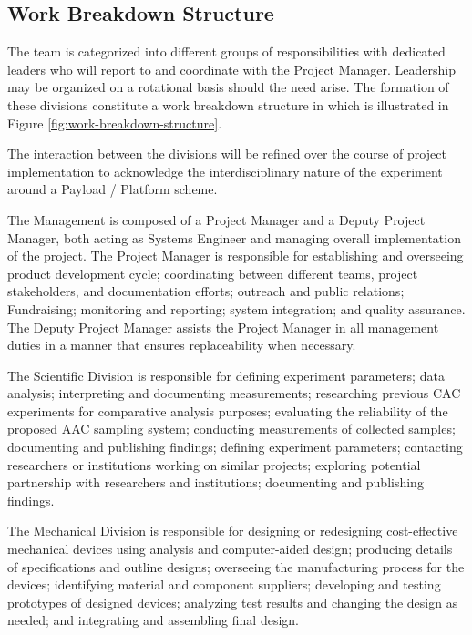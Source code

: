 
\subsection{Work Breakdown Structure}

The team is categorized into different groups of responsibilities with dedicated leaders who will report to and coordinate with the Project Manager. Leadership may be organized on a rotational basis should the need arise. The formation of these divisions constitute a work breakdown structure in which is illustrated in Figure \ref{fig:work-breakdown-structure}.


The interaction between the divisions will be refined over the course of project implementation to acknowledge the interdisciplinary nature of the experiment around a Payload / Platform scheme.

The Management is composed of a Project Manager and a Deputy Project Manager, both acting as Systems Engineer and managing overall implementation of the project. The Project Manager is responsible for establishing and overseeing product development cycle; coordinating between different teams, project stakeholders, and documentation efforts; outreach and public relations; Fundraising; monitoring and reporting; system integration; and quality assurance. The Deputy Project Manager assists the Project Manager in all management duties in a manner that ensures replaceability when necessary.

The Scientific Division is responsible for defining experiment parameters; data analysis; interpreting and documenting measurements; researching previous CAC experiments for comparative analysis purposes; evaluating the reliability of the proposed AAC sampling system; conducting measurements of collected samples; documenting and publishing findings; defining experiment parameters; contacting researchers or institutions working on similar projects; exploring potential partnership with researchers and institutions; documenting and publishing findings.

The Mechanical Division is responsible for designing or redesigning cost-effective mechanical devices using analysis and computer-aided design; producing details of specifications and outline designs; overseeing the manufacturing process for the devices; identifying material and component suppliers; developing and testing prototypes of designed devices; analyzing test results and changing the design as needed; and integrating and assembling final design.

